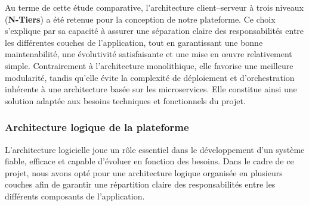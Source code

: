 Au terme de cette étude comparative, l'architecture client--serveur à trois niveaux
(\textbf{N-Tiers}) a été retenue pour la conception de notre plateforme. Ce choix
s'explique par sa capacité à assurer une séparation claire des responsabilités entre les
différentes couches de l'application, tout en garantissant une bonne maintenabilité, une
évolutivité satisfaisante et une mise en œuvre relativement simple. Contrairement à
l'architecture monolithique, elle favorise une meilleure modularité, tandis qu'elle
évite la complexité de déploiement et d'orchestration inhérente à une architecture
basée sur les microservices. Elle constitue ainsi une solution adaptée aux besoins
techniques et fonctionnels du projet.

\subsubsection{Architecture logique de la plateforme}
L'architecture logicielle joue un rôle essentiel dans le développement d'un système
fiable, efficace et capable d'évoluer en fonction des besoins. Dans le cadre de ce
projet, nous avons opté pour une architecture logique organisée en plusieurs couches
afin de garantir une répartition claire des responsabilités entre les différents
composants de l'application.

